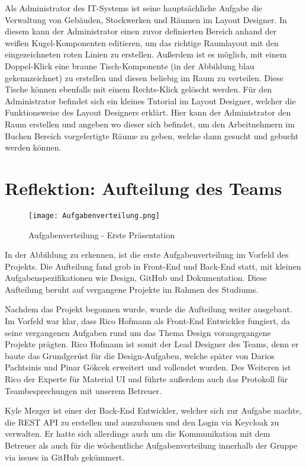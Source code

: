 Als Administrator des IT-Systems ist seine hauptsächliche Aufgabe die Verwaltung von Gebäuden, Stockwerken und Räumen im Layout Designer.
In diesem kann der Administrator einen zuvor definierten Bereich anhand der weißen Kugel-Komponenten editieren, um das richtige Raumlayout mit den eingezeichneten roten Linien zu erstellen.
Außerdem ist es möglich, mit einem Doppel-Klick eine braune Tisch-Komponente (in der Abbildung blau gekennzeichnet) zu erstellen und diesen beliebig im Raum zu verteilen.
Diese Tische können ebenfalls mit einem Rechts-Klick gelöscht werden.
Für den Administrator befindet sich ein kleines Tutorial im Layout Designer, welcher die Funktionsweise des Layout Designers erklärt.
Hier kann der Administrator den Raum erstellen und angeben wo dieser sich befindet, um den Arbeitnehmern im Buchen Bereich vorgefertigte Räume zu geben, welche dann gesucht und gebucht werden können.

\pagebreak

\section{Reflektion: Aufteilung des Teams}

\begin{figure}[!h]
    \centering
    \texttt{[image: Aufgabenverteilung.png]}
    \caption{Aufgabenverteilung - Erste Präsentation}
    \label{fig:Aufgabenverteilung}
\end{figure}

In der Abbildung zu erkennen, ist die erste Aufgabenverteilung im Vorfeld des Projekts.
Die Aufteilung fand grob in Front-End und Back-End statt, mit kleinen Aufgabenspezifikationen wie Design, GitHub und Dokumentation.
Diese Aufteilung beruht auf vergangene Projekte im Rahmen des Studiums.

Nachdem das Projekt begonnen wurde, wurde die Aufteilung weiter ausgebaut.
Im Vorfeld war klar, dass Rico Hofmann als Front-End Entwickler fungiert, da seine vergangenen Aufgaben rund um das Thema Design vorangegangene Projekte prägten.
Rico Hofmann ist somit der Lead Designer des Teams, denn er baute das Grundgerüst für die Design-Aufgaben, welche später von Darios Pachtsinis und Pinar Gökcek erweitert und vollendet wurden.
Des Weiteren ist Rico der Experte für Material UI und führte außerdem auch das Protokoll für Teambesprechungen mit unserem Betreuer.

Kyle Mezger ist einer der Back-End Entwickler, welcher sich zur Aufgabe machte, die REST API zu erstellen und auszubauen und den Login via Keycloak zu verwalten.
Er hatte sich allerdings auch um die Kommunikation mit dem Betreuer als auch für die wöchentliche Aufgabenverteilung innerhalb der Gruppe via issues in GitHub gekümmert.

